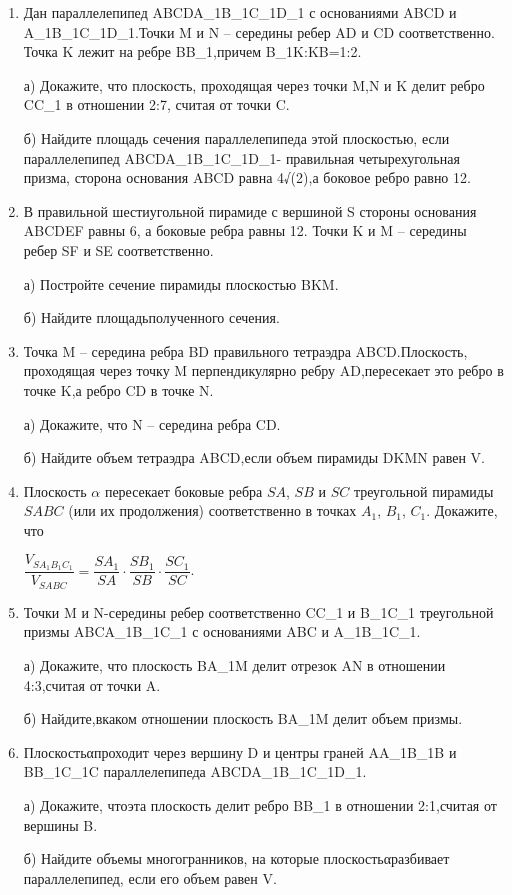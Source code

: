 \documentclass[12pt]{article}
\begin{document}
\begin{enumerate}
  \item Дан параллелепипед ABCDA\_1B\_1C\_1D\_1 с основаниями ABCD и A\_1B\_1C\_1D\_1.Точки M и N – середины ребер AD и CD соответственно. Точка K лежит на ребре BB\_1,причем B\_1K:KB=1:2.
  \par а) Докажите, что плоскость, проходящая через точки M,N и K делит ребро CC\_1 в отношении 2:7, считая от точки C.
  \par б) Найдите площадь сечения параллелепипеда этой плоскостью, если параллелепипед ABCDA\_1B\_1C\_1D\_1- правильная четырехугольная призма, сторона основания ABCD равна 4√(2),а боковое ребро равно 12.
  \item В правильной шестиугольной пирамиде с вершиной S стороны основания ABCDEF равны 6, а боковые ребра равны 12. Точки K и M – середины ребер SF и SE соответственно.
  \par а) Постройте сечение пирамиды плоскостью BKM.
  \par б) Найдите площадьполученного сечения.
  \item Точка M – середина ребра BD правильного тетраэдра ABCD.Плоскость, проходящая через точку M перпендикулярно ребру AD,пересекает это ребро в точке K,а ребро CD в точке N.
  \par а) Докажите, что N – середина ребра CD.
  \par б) Найдите объем тетраэдра ABCD,если объем пирамиды DKMN равен V.
  \item Плоскость $\alpha$ пересекает боковые ребра $SA$, $SB$ и $SC$ треугольной пирамиды $SABC$ (или их продолжения) соответственно в точках $A_1$, $B_1$, $C_1$. Докажите, что
  \par $\dfrac{V_{SA_1B_1C_1}}{V_{SABC}}=\dfrac{SA_1}{SA}\cdot\dfrac{SB_1}{SB}\cdot\dfrac{SC_1}{SC}$.
  \item Точки M и N-середины ребер соответственно CC\_1 и B\_1C\_1 треугольной призмы ABCA\_1B\_1C\_1 с основаниями ABC и A\_1B\_1C\_1.
  \par а) Докажите, что плоскость BA\_1M делит отрезок AN в отношении 4:3,считая от точки A.
  \par б) Найдите,вкаком отношении плоскость BA\_1M делит объем призмы.
  \item Плоскостьαпроходит через вершину D и центры граней AA\_1B\_1B и BB\_1C\_1C параллелепипеда ABCDA\_1B\_1C\_1D\_1.
  \par а) Докажите, чтоэта плоскость делит ребро BB\_1 в отношении 2:1,считая от вершины B.
  \par б) Найдите объемы многогранников, на которые плоскостьαразбивает параллелепипед, если его объем равен V.

\end{enumerate}
\end{document}

